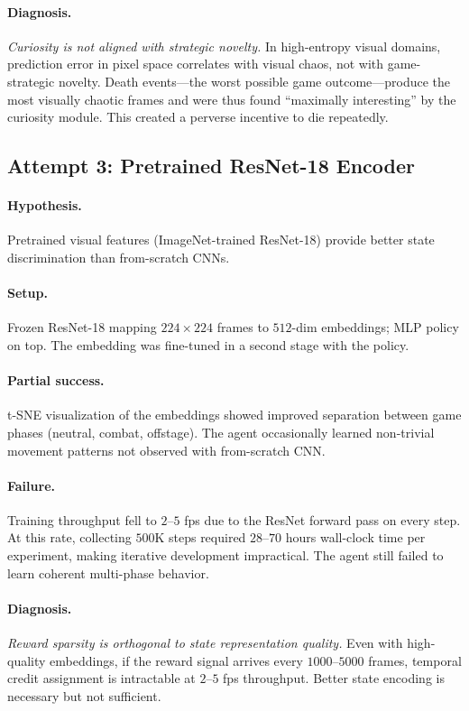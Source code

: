 \documentclass[11pt,a4paper]{article}
\begin{document}
\paragraph{Diagnosis.}
\emph{Curiosity is not aligned with strategic novelty.}
In high-entropy visual domains, prediction error in pixel space correlates with visual chaos, not with game-strategic novelty.
Death events---the worst possible game outcome---produce the most visually chaotic frames and were thus found ``maximally interesting'' by the curiosity module.
This created a perverse incentive to die repeatedly.

\subsection{Attempt 3: Pretrained ResNet-18 Encoder}
\label{sec:resnet-failure}

\paragraph{Hypothesis.}
Pretrained visual features (ImageNet-trained ResNet-18) provide better state discrimination than from-scratch CNNs.

\paragraph{Setup.}
Frozen ResNet-18 mapping $224 \times 224$ frames to $512$-dim embeddings; MLP policy on top.
The embedding was fine-tuned in a second stage with the policy.

\paragraph{Partial success.}
t-SNE visualization of the embeddings showed improved separation between game phases (neutral, combat, offstage).
The agent occasionally learned non-trivial movement patterns not observed with from-scratch CNN.

\paragraph{Failure.}
Training throughput fell to $2$--$5$ fps due to the ResNet forward pass on every step.
At this rate, collecting $500$K steps required $28$--$70$ hours wall-clock time per experiment, making iterative development impractical.
The agent still failed to learn coherent multi-phase behavior.

\paragraph{Diagnosis.}
\emph{Reward sparsity is orthogonal to state representation quality.}
Even with high-quality embeddings, if the reward signal arrives every $1000$--$5000$ frames, temporal credit assignment is intractable at $2$--$5$ fps throughput.
Better state encoding is necessary but not sufficient.
\end{document}
